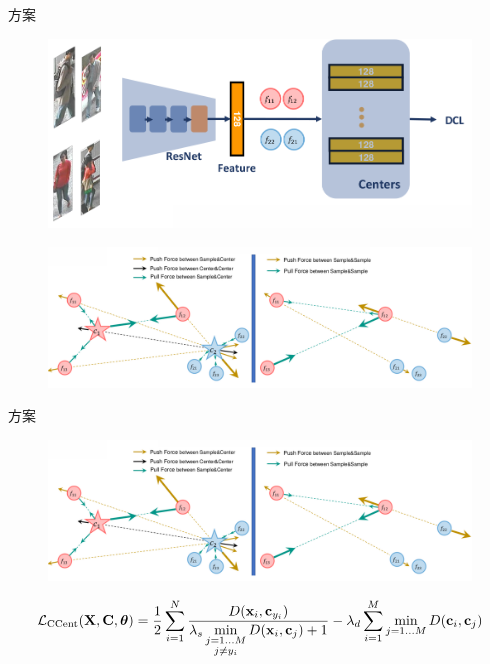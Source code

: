 \documentclass[notes]{beamer}
\begin{document}
\begin{frame}{方案}

	\begin{figure}
		\centering
		\includegraphics[width=.65\textwidth]{fig/2018-05-19-22-25-00.png}
		\label{fig:dcent}
	\end{figure}

	\begin{figure}
		\centering
		\includegraphics[width=.9\textwidth]{fig/2018-05-19-22-25-11.png}
		\label{fig:dcent2}
	\end{figure}
\end{frame}

\begin{frame}{方案}
	\begin{figure}
		\centering
		\includegraphics[width=1\textwidth]{fig/2018-05-19-22-25-11.png}
	\end{figure}
	\begin{equation}
		\mathcal{L}_{\textrm{CCent}} ({\mathbf{X}}, {\mathbf{C}}, {\boldsymbol{\theta}}) = \frac{1}{2}
		\sum_{i=1}^{N}
		\frac{D(
			{\mathbf{x}}_{i}, {\mathbf{c}}_{y_i}
			)}{
			\displaystyle \lambda_s
			\min_{\substack{
					j=1...M \\
					j \neq y_i }}
			D(
			{\mathbf{x}}_{i}, {\mathbf{c}}_{j}
			) + 1 }
		-
		\lambda_d \sum_{i=1}^{M}  \min_{j=1...M} D({\mathbf{c}}_i,{\mathbf{c}}_j)
		\label{eq:ccent}
	\end{equation}

\end{frame}
\end{document}
